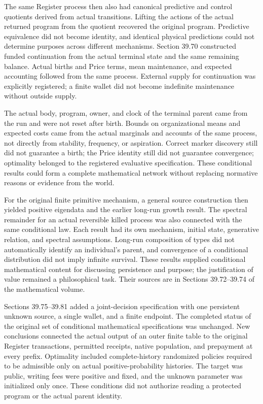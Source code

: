 \documentclass[
  english,
  11pt,
  oneside]{book}
\begin{document}
The same Register process then also had canonical predictive and control quotients derived from actual transitions. Lifting the actions of the actual returned program from the quotient recovered the original program. Predictive equivalence did not become identity, and identical physical predictions could not determine purposes across different mechanisms. Section 39.70 constructed funded continuation from the actual terminal state and the same remaining balance. Actual births and Price terms, mean maintenance, and expected accounting followed from the same process. External supply for continuation was explicitly registered; a finite wallet did not become indefinite maintenance without outside supply.

The actual body, program, owner, and clock of the terminal parent came from the run and were not reset after birth. Bounds on organizational means and expected costs came from the actual marginals and accounts of the same process, not directly from stability, frequency, or aspiration. Correct marker discovery still did not guarantee a birth; the Price identity still did not guarantee convergence; optimality belonged to the registered evaluative specification. These conditional results could form a complete mathematical network without replacing normative reasons or evidence from the world.

For the original finite primitive mechanism, a general source construction then yielded positive eigendata and the earlier long-run growth result. The spectral remainder for an actual reversible killed process was also connected with the same conditional law. Each result had its own mechanism, initial state, generative relation, and spectral assumptions. Long-run composition of types did not automatically identify an individual's parent, and convergence of a conditional distribution did not imply infinite survival. These results supplied conditional mathematical content for discussing persistence and purpose; the justification of value remained a philosophical task. Their sources are in Sections 39.72--39.74 of the mathematical volume.

Sections 39.75--39.81 added a joint-decision specification with one persistent unknown source, a single wallet, and a finite endpoint. The completed status of the original set of conditional mathematical specifications was unchanged. New conclusions connected the actual output of an outer finite table to the original Register transactions, permitted receipts, native population, and prepayment at every prefix. Optimality included complete-history randomized policies required to be admissible only on actual positive-probability histories. The target was public, writing fees were positive and fixed, and the unknown parameter was initialized only once. These conditions did not authorize reading a protected program or the actual parent identity.
\end{document}
